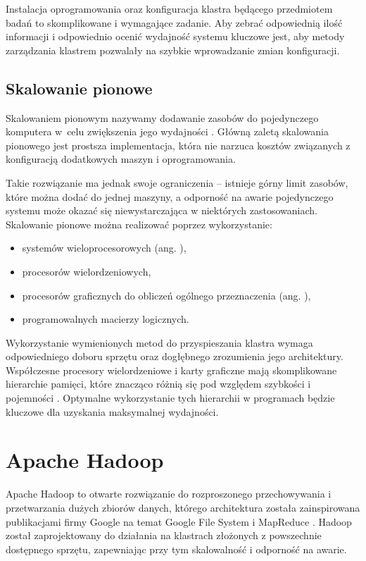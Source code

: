 Instalacja oprogramowania oraz konfiguracja klastra będącego przedmiotem badań to skomplikowane i
wymagające zadanie. Aby zebrać odpowiednią ilość informacji i odpowiednio ocenić wydajność systemu
kluczowe jest, aby metody zarządzania klastrem pozwalały na szybkie wprowadzanie zmian konfiguracji.

\subsection*{Skalowanie pionowe}

Skalowaniem pionowym nazywamy dodawanie zasobów do pojedynczego komputera w~celu zwiększenia jego
wydajności \cite{big-data-3}. Główną zaletą skalowania pionowego jest prostsza implementacja, która
nie narzuca kosztów związanych z konfiguracją dodatkowych maszyn i oprogramowania.

Takie rozwiązanie ma jednak swoje ograniczenia -- istnieje górny limit zasobów, które można dodać
do jednej maszyny, a odporność na awarie pojedynczego systemu może okazać się niewystarczająca
w niektórych zastosowaniach. Skalowanie pionowe można realizować poprzez wykorzystanie:
\begin{itemize}
      \item systemów wieloprocesorowych (ang. ),
      \item procesorów wielordzeniowych,
      \item procesorów graficznych do obliczeń ogólnego przeznaczenia \newline
            (ang. ),
      \item programowalnych macierzy logicznych.
\end{itemize}

Wykorzystanie wymienionych metod do przyspieszania klastra 
wymaga odpowiedniego doboru sprzętu oraz dogłębnego zrozumienia jego architektury. Współczesne
procesory wielordzeniowe i karty graficzne mają skomplikowane hierarchie pamięci, które
znacząco różnią się pod względem szybkości i pojemności \cite{computer-arch}. Optymalne
wykorzystanie tych hierarchii w programach będzie kluczowe dla uzyskania maksymalnej wydajności.

\section{Apache Hadoop}

Apache Hadoop to otwarte rozwiązanie do rozproszonego przechowywania i przetwarzania
dużych zbiorów danych, którego architektura została zainspirowana publikacjami firmy Google
na temat Google File System i MapReduce \cite{big-data-3}. Hadoop został zaprojektowany
do działania na klastrach złożonych z powszechnie dostępnego sprzętu, zapewniając przy
tym skalowalność i odporność na awarie.

